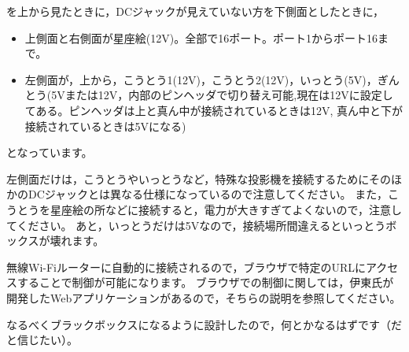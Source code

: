\documentclass[letterpaper,10pt,dvipdfmx]{sphinxmanual}
\begin{document}
を上から見たときに，DCジャックが見えていない方を下側面としたときに，
\begin{itemize}
\item {} 
上側面と右側面が星座絵(12V)。全部で16ポート。ポート1からポート16まで。

\item {} 
左側面が，上から，こうとう1(12V)，こうとう2(12V)，いっとう(5V)，ぎんとう(5Vまたは12V，内部のピンヘッダで切り替え可能,現在は12Vに設定してある。ピンヘッダは上と真ん中が接続されているときは12V,
真ん中と下が接続されているときは5Vになる)

\end{itemize}

となっています。 

左側面だけは，こうとうやいっとうなど，特殊な投影機を接続するためにそのほかのDCジャックとは異なる仕様になっているので注意してください。
また，こうとうを星座絵の所などに接続すると，電力が大きすぎてよくないので，注意してください。
あと，いっとうだけは5Vなので，接続場所間違えるといっとうボックスが壊れます。

無線Wi-Fiルーターに自動的に接続されるので，ブラウザで特定のURLにアクセスすることで制御が可能になります。
ブラウザでの制御に関しては，伊東氏が開発したWebアプリケーションがあるので，そちらの説明を参照してください。

なるべくブラックボックスになるように設計したので，何とかなるはずです（だと信じたい）。
\end{document}
